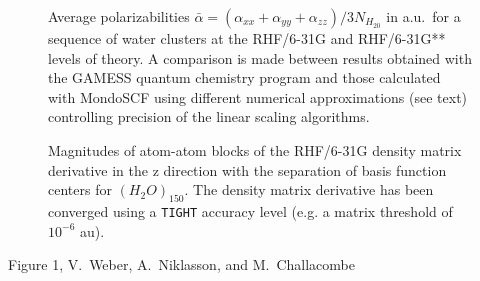 \documentclass[prl,aps,preprint,showpacs,superbib]{revtex4}
\begin{document}
{\begin{figure}[h]
\caption{\protect Average polarizabilities $\bar{\alpha}=(\alpha_{xx}+\alpha_{yy}+\alpha_{zz})/3N_{H_20}$
         in a.u.~for a sequence of water clusters at the RHF/6-31G and RHF/6-31G** levels of theory.
         A comparison is made between results obtained with the {\sc GAMESS} quantum chemistry program
         \cite{gamess} and those calculated with {\sc MondoSCF} using different numerical approximations
         (see text) controlling precision of the linear scaling algorithms.}\label{tab:Polari_Values}


\caption{\protect
    Magnitudes of atom-atom blocks of the RHF/6-31G density matrix derivative
    in the z direction with the separation of basis function centers for $(H_2O)_{150}$.
    The density matrix derivative has been converged using a {\tt TIGHT} accuracy level (e.g. 
    a matrix threshold of $10^{-6}$ au).}\label{fig:DPrimeZ_150_6-31G}

\end{figure}

\clearpage

\begin{center}
Figure 1, V.~Weber, A.~Niklasson,  and M.~Challacombe \\[1.cm]
\end{center}

}
\end{document}
